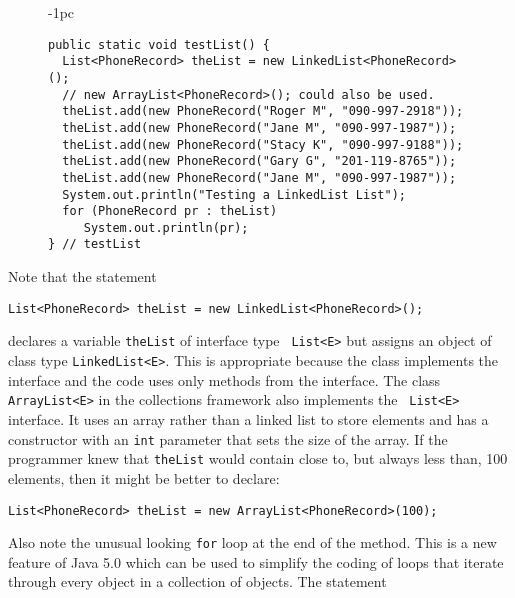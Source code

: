 \begin{figure}[htb]
\jjjprogstart
\begin{jjjlistingleft}[27pc]{-1pc}
\begin{lstlisting}
public static void testList() {
  List<PhoneRecord> theList = new LinkedList<PhoneRecord>();
  // new ArrayList<PhoneRecord>(); could also be used.
  theList.add(new PhoneRecord("Roger M", "090-997-2918"));
  theList.add(new PhoneRecord("Jane M", "090-997-1987"));
  theList.add(new PhoneRecord("Stacy K", "090-997-9188"));
  theList.add(new PhoneRecord("Gary G", "201-119-8765"));
  theList.add(new PhoneRecord("Jane M", "090-997-1987"));
  System.out.println("Testing a LinkedList List");
  for (PhoneRecord pr : theList)
     System.out.println(pr);
} // testList
\end{lstlisting}
\end{jjjlistingleft}
\end{figure}


\noindent Note that the statement

\begin{jjjlisting}
\begin{lstlisting}
List<PhoneRecord> theList = new LinkedList<PhoneRecord>();
\end{lstlisting}
\end{jjjlisting}

\noindent declares a variable {\tt theList} of interface type {\tt
List<E>} but assigns an object of class type {\tt LinkedList<E>}.
This is appropriate because the class implements the interface and the
code uses only methods from the interface.  The class {\tt
ArrayList<E>} in the collections framework also implements the {\tt
List<E>} interface.  It uses an array rather than a linked list to
store elements and has a constructor with an {\tt int} parameter that
sets the size of the array.  If the programmer knew that {\tt theList}
would contain close to, but always less than, 100 elements, then it
might be better to declare:

\begin{jjjlisting}
\begin{lstlisting}
List<PhoneRecord> theList = new ArrayList<PhoneRecord>(100);
\end{lstlisting}
\end{jjjlisting}

\noindent Also note the unusual looking {\tt for} loop at the end of
the method.  This is a new feature of Java 5.0 which can be used to simplify
the coding of loops that iterate through every object in a collection
of objects. The statement 

